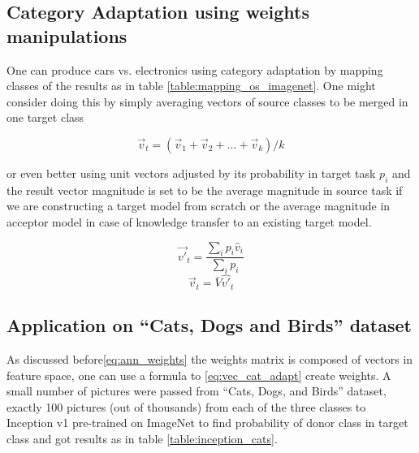 \subsection{Category Adaptation using weights manipulations}

One can produce cars vs. electronics using category adaptation
by mapping classes of the results as in table \ref{table:mapping_os_imagenet}.
One might consider doing this by simply averaging vectors of source classes to be merged in one target class

\begin{equation}
\vec{v}_{t} = ( \vec{v}_1+\vec{v}_2+\ldots+\vec{v}_k ) / k
\label{eq:cat_adapt_avg}
\end{equation}

or even better using unit vectors adjusted by its probability in target task \(p_i\)
and the result vector magnitude is set to be the average magnitude in source task
if we are constructing a target model from scratch or the average magnitude in acceptor model
in case of knowledge transfer to an existing target model.

\begin{equation}
\vec{v'}_{t} = \frac{ \sum\nolimits_{i} p_{i}\hat{v}_i }{ \sum\nolimits_{i} p_{i} }
\label{eq:vec_cat_adapt}
\end{equation}
\begin{equation}
\vec{v}_{t} = \bar{V} \hat{v'}_{t}
\label{eq:vec_cat_adapt2}
\end{equation}


\subsection{Application on ``Cats, Dogs and Birds'' dataset}

As discussed before\ref{eq:ann_weights} the weights matrix is composed of vectors in feature space,
one can use a formula to \ref{eq:vec_cat_adapt} create weights.
A small number of pictures were passed from ``Cats, Dogs, and Birds'' dataset,
exactly 100 pictures (out of thousands) from each of the three classes to Inception v1 pre-trained on ImageNet
to find probability of donor class in target class and got results as in table \ref{table:inception_cats}.

